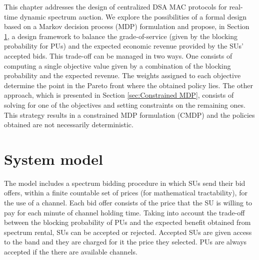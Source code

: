 This chapter addresses the design of centralized DSA MAC protocols for real-time dynamic spectrum auction. We explore the possibilities of a formal design based on a Markov decision process (MDP) formulation and propose, in Section \ref{Sarnoff_sec_model}, a design framework to balance the grade-of-service (given by the blocking probability for PUs) and the expected economic revenue provided by the SUs' accepted bids. This trade-off can be managed in two ways. One consists of computing a single objective value given by a combination of the blocking probability and the expected revenue. The weights assigned to each objective determine the point in the Pareto front where the obtained policy lies. The other approach, which is presented in Section \ref{sec:Constrained MDP}, consists of solving for one of the objectives and setting constraints on the remaining ones.
This strategy results in a constrained MDP formulation (CMDP) and the policies obtained are not necessarily deterministic.

\section{System model}\label{Sarnoff_sec_model}

The model includes a spectrum bidding procedure in which SUs send their bid offers, within a finite countable set of prices (for mathematical tractability), for the use of a channel. Each bid offer consists of the price that the SU is willing to pay for each minute of channel holding time. Taking into account the trade-off between the blocking probability of PUs and the expected benefit obtained from spectrum rental, SUs can be accepted or rejected. Accepted SUs are given access to the band and they are charged for it the price they selected. PUs are always accepted if the there are available channels.

